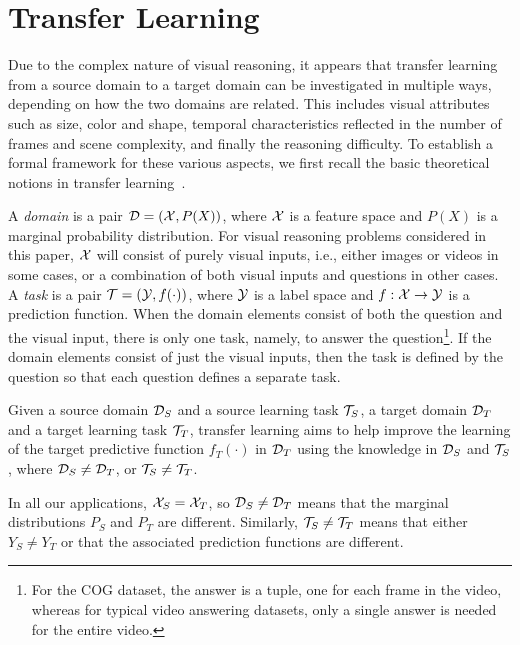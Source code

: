 \section{Transfer Learning}
\label{sec:transfer_learning}
Due to the complex nature of visual reasoning, it appears that
transfer learning from a source domain to a target domain can be investigated in
multiple ways, depending on how the two domains are related. This includes visual attributes such as size, color and shape, temporal characteristics reflected in the number of frames and scene complexity, and finally the reasoning difficulty. 
To establish a formal framework for these various aspects, we first recall the basic theoretical notions in transfer learning~\cite{pan2009survey}.

A \emph{domain} is a pair $\mathcal{D} = (\mathcal{X},P(X))$, where $\mathcal{X}$ is a feature space and $P(X)$ is a marginal probability distribution.
For visual reasoning problems considered in this paper,
$\mathcal{X}$ will consist of purely visual inputs, i.e., either images or videos in some cases, or
a combination of both visual inputs and questions in other cases.
A \emph{task} is a pair $\mathcal{T}= (\mathcal{Y},f(\cdot))$, where $\mathcal{Y}$ is a label space and $f: \mathcal{X} \to \mathcal{Y}$ is a prediction function.
When the domain elements consist of both the question and the visual input, there is only one task, namely, to answer the
question\footnote{%
	For the COG dataset, the answer is a tuple, one for each frame in the video, whereas for typical video answering datasets,
	only a single answer is needed for the entire video.}. %
If the domain elements consist of just the visual inputs, then the task is defined by the question so that each question
defines a separate task.

\begin{definition}
	\label{defn:transfer}
	Given a source domain $\mathcal{D}_S$ and a source learning task $\mathcal{T}_S$, a target domain $\mathcal{D}_T$ and a target learning task $\mathcal{T}_T$, transfer learning aims to help improve the
	learning of the target predictive function $f_T(\cdot)$ in $\mathcal{D}_T$ using the knowledge  in $\mathcal{D}_S$ and $\mathcal{T}_S$, where $\mathcal{D}_S \ne \mathcal{D}_T$, or $\mathcal{T}_S \ne \mathcal{T}_T$.
\end{definition}
In all our applications, $\mathcal{X}_S = \mathcal{X}_T$, so $\mathcal{D}_S \ne \mathcal{D}_T$ means that the marginal distributions $P_S$ and $P_T$ are different.
Similarly, $\mathcal{T}_S \ne \mathcal{T}_T$ means that either $Y_S \ne Y_T$ or that the associated prediction functions are different.

